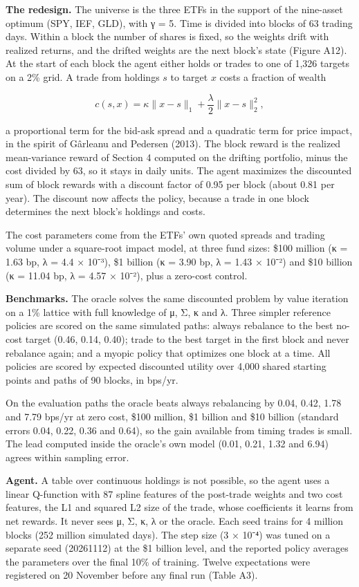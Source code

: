 \documentclass[
  11pt]{article}
\begin{document}
\textbf{The redesign.} The universe is the three ETFs in the support of
the nine-asset optimum (SPY, IEF, GLD), with γ = 5. Time is divided into
blocks of 63 trading days. Within a block the number of shares is fixed,
so the weights drift with realized returns, and the drifted weights are
the next block's state (Figure A12). At the start of each block the
agent either holds or trades to one of 1,326 targets on a 2\% grid. A
trade from holdings \(s\) to target \(x\) costs a fraction of wealth

\[c(s, x) = \kappa \lVert x - s \rVert_1 + \frac{\lambda}{2} \lVert x - s \rVert_2^2 ,\]

a proportional term for the bid-ask spread and a quadratic term for
price impact, in the spirit of Gârleanu and Pedersen (2013). The block
reward is the realized mean-variance reward of Section 4 computed on the
drifting portfolio, minus the cost divided by 63, so it stays in daily
units. The agent maximizes the discounted sum of block rewards with a
discount factor of 0.95 per block (about 0.81 per year). The discount
now affects the policy, because a trade in one block determines the next
block's holdings and costs.

The cost parameters come from the ETFs' own quoted spreads and trading
volume under a square-root impact model, at three fund sizes: \$100
million (κ = 1.63 bp, λ = 4.4 × 10⁻³), \$1 billion (κ = 3.90 bp, λ =
1.43 × 10⁻²) and \$10 billion (κ = 11.04 bp, λ = 4.57 × 10⁻²), plus a
zero-cost control.

\textbf{Benchmarks.} The oracle solves the same discounted problem by
value iteration on a 1\% lattice with full knowledge of μ, Σ, κ and λ.
Three simpler reference policies are scored on the same simulated paths:
always rebalance to the best no-cost target (0.46, 0.14, 0.40); trade to
the best target in the first block and never rebalance again; and a
myopic policy that optimizes one block at a time. All policies are
scored by expected discounted utility over 4,000 shared starting points
and paths of 90 blocks, in bps/yr.

On the evaluation paths the oracle beats always rebalancing by 0.04,
0.42, 1.78 and 7.79 bps/yr at zero cost, \$100 million, \$1 billion and
\$10 billion (standard errors 0.04, 0.22, 0.36 and 0.64), so the gain
available from timing trades is small. The lead computed inside the
oracle's own model (0.01, 0.21, 1.32 and 6.94) agrees within sampling
error.

\textbf{Agent.} A table over continuous holdings is not possible, so the
agent uses a linear Q-function with 87 spline features of the post-trade
weights and two cost features, the L1 and squared L2 size of the trade,
whose coefficients it learns from net rewards. It never sees μ, Σ, κ, λ
or the oracle. Each seed trains for 4 million blocks (252 million
simulated days). The step size (3 × 10⁻⁴) was tuned on a separate seed
(20261112) at the \$1 billion level, and the reported policy averages
the parameters over the final 10\% of training. Twelve expectations were
registered on 20 November before any final run (Table A3).
\end{document}
